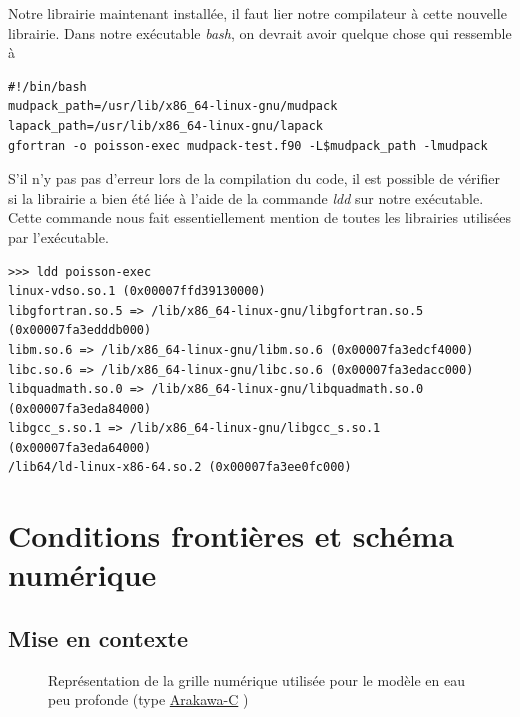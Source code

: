 \documentclass[10pt]{article}
\numberwithin{equation}{section}
\newcommand{\pt}{\hspace{1pt}}
\begin{document}
Notre librairie maintenant installée, il faut lier notre compilateur à cette nouvelle librairie.
Dans notre exécutable \emph{bash}, on devrait avoir quelque chose qui ressemble à
\begin{verbatim}
#!/bin/bash
mudpack_path=/usr/lib/x86_64-linux-gnu/mudpack
lapack_path=/usr/lib/x86_64-linux-gnu/lapack
gfortran -o poisson-exec mudpack-test.f90 -L$mudpack_path -lmudpack
\end{verbatim}
S'il n'y pas pas d'erreur lors de la compilation du code, il est possible de vérifier si la librairie a bien été liée à l'aide de la commande \emph{ldd} sur notre exécutable.
Cette commande nous fait essentiellement mention de toutes les librairies utilisées par l'exécutable.
\begin{verbatim}
>>> ldd poisson-exec
linux-vdso.so.1 (0x00007ffd39130000)
libgfortran.so.5 => /lib/x86_64-linux-gnu/libgfortran.so.5 (0x00007fa3edddb000)
libm.so.6 => /lib/x86_64-linux-gnu/libm.so.6 (0x00007fa3edcf4000)
libc.so.6 => /lib/x86_64-linux-gnu/libc.so.6 (0x00007fa3edacc000)
libquadmath.so.0 => /lib/x86_64-linux-gnu/libquadmath.so.0 (0x00007fa3eda84000)
libgcc_s.so.1 => /lib/x86_64-linux-gnu/libgcc_s.so.1 (0x00007fa3eda64000)
/lib64/ld-linux-x86-64.so.2 (0x00007fa3ee0fc000)
\end{verbatim}

\section{Conditions frontières et schéma numérique}
\label{sec:orgeb64327}
\subsection{Mise en contexte}
\label{sec:org4e5f32c}
\begin{figure}
\vspace{-\baselineskip}
\centering
{}
\caption{\label{org3e3b052}Représentation de la grille numérique utilisée pour le modèle en eau peu profonde (type \href{https://en.wikipedia.org/wiki/Arakawa\_grids}{Arakawa-C} )}
\end{figure}
\end{document}
